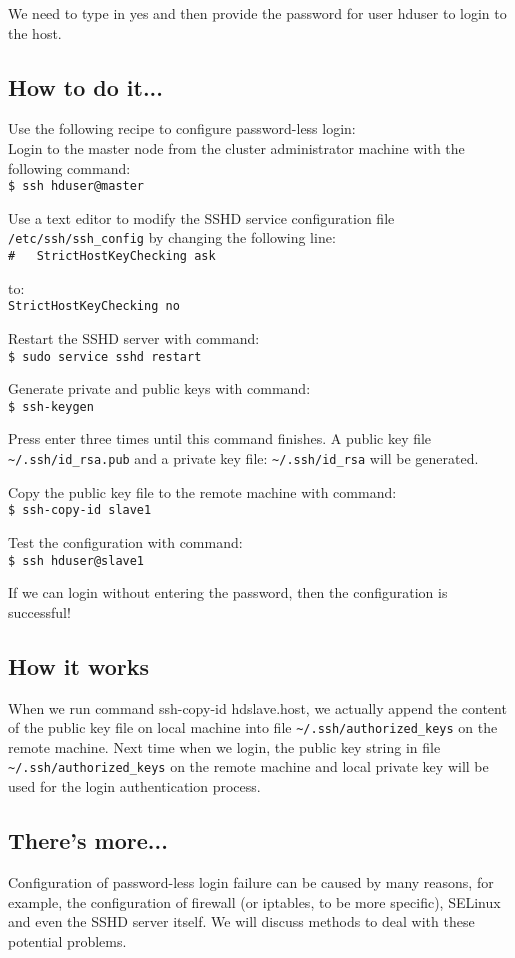 We need to type in yes and then provide the password for user hduser to login to the host.
\subsection*{How to do it...}
Use the following recipe to configure password-less login: \\
Login to the master node from the cluster administrator machine with the following command: \\
\verb|$ ssh hduser@master|

Use a text editor to modify the SSHD service configuration file \verb|/etc/ssh/ssh_config| by changing the following line: \\
\verb|#   StrictHostKeyChecking ask|

to: \\
\verb|StrictHostKeyChecking no|

Restart the SSHD server with command: \\
\verb|$ sudo service sshd restart|

Generate private and public keys with command: \\
\verb|$ ssh-keygen|

Press enter three times until this command finishes. A public key file \verb|~/.ssh/id_rsa.pub| and a private key file: \verb|~/.ssh/id_rsa| will be generated.

Copy the public key file to the remote machine with command: \\
\verb|$ ssh-copy-id slave1|

Test the configuration with command: \\
\verb|$ ssh hduser@slave1|

If we can login without entering the password, then the configuration is successful!
\subsection*{How it works}
When we run command ssh-copy-id hdslave.host, we actually append the content of the public key file on local machine into file \verb|~/.ssh/authorized_keys| on the remote machine. Next time when we login, the public key string in file \verb|~/.ssh/authorized_keys| on the remote machine and local private key will be used for the login authentication process.
\subsection*{There's more...}
Configuration of password-less login failure can be caused by many reasons, for example, the configuration of firewall (or iptables, to be more specific), SELinux and even the SSHD server itself. We will discuss methods to deal with these potential problems.
